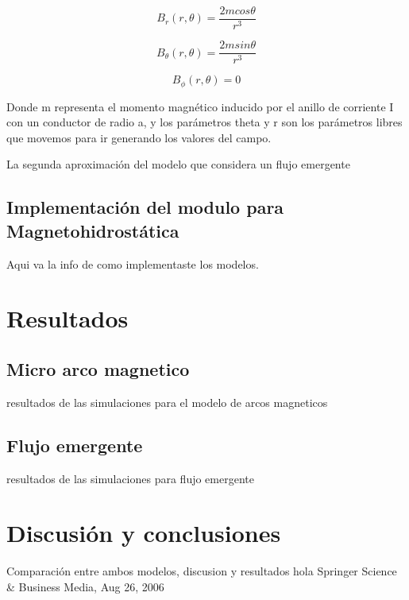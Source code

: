 \documentclass[9pt]{book}
\begin{document}
\begin{equation}
    B_r(r,\theta)=\frac{2mcos\theta}{r^3}
\end{equation}
  
\begin{equation}
    B_\theta(r,\theta)=\frac{2msin\theta}{r^3}
\end{equation}

\begin{equation}
    B_\phi(r,\theta)=0
\end{equation}

Donde m representa el momento magn\'etico inducido por el anillo de corriente I con un conductor de radio a, y los parámetros theta y r son los par\'ametros libres que movemos para ir generando los valores del campo.

La segunda aproximaci\'on del modelo que considera un flujo emergente

\section{Implementaci\'on del modulo para Magnetohidrost\'atica}
Aqui va la info de como implementaste los modelos.


\chapter{Resultados}
\section{Micro arco magnetico}
resultados de las simulaciones para el modelo de arcos magneticos
\section{Flujo emergente}
resultados de las simulaciones para flujo emergente


\chapter{Discusi\'on y conclusiones}
Comparaci\'on entre ambos modelos, discusion y resultados
hola Springer Science \& Business Media, Aug 26, 2006
\end{document}
